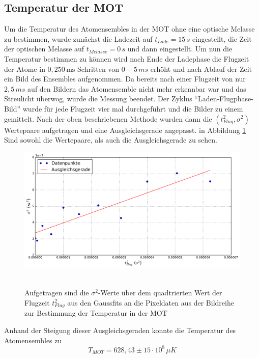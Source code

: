 \documentclass[twoside,colorback,accentcolor=tud4c,11pt]{tudreport}
\begin{document}
\subsection{Temperatur der MOT}
Um die Temperatur des Atomensembles in der MOT ohne eine optische Melasse zu bestimmen, wurde zunächst die Ladezeit auf $t_{Lade}=15\,\si{s}$ eingestellt, die Zeit der optischen Melasse auf $t_{Melasse}=0\,\si{s}$ und dann eingestellt. Um nun die Temperatur bestimmen zu können wird nach Ende der Ladephase die Flugzeit der Atome in $0,250\,\si{\ms}$ Schritten von $0-5\,\si{ms}$ erhöht und nach Ablauf der Zeit ein Bild des Ensembles aufgenommen. Da bereits nach einer Flugzeit von nur $2,5\,\si{ms}$ auf den Bildern das Atomensemble nicht mehr erkennbar war und das Streulicht überwog, wurde die Messung beendet. Der Zyklus "`Laden-Flugphase-Bild"' wurde für jede Flugzeit vier mal durchgeführt und die Bilder zu einem gemittelt. Nach der oben beschriebenen Methode wurden dann die $(t_{Flug}^2,\sigma^2)$ Wertepaare aufgetragen und eine Ausgleichsgerade angepasst. in Abbildung \ref{tmot} Sind sowohl die Wertepaare, als auch die Ausgleichsgerade zu sehen.
\begin{figure}[H]
\centering
   	\begin{minipage}[b]{0.85\textwidth}
   	\includegraphics[width=\textwidth]{graphics/tempmot.pdf}\
   	\end{minipage}
\caption{Aufgetragen sind die $\sigma^2$-Werte über dem quadtrierten Wert der Flugzeit $t_{Flug}^2$ aus den Gaussfits an die Pixeldaten aus der Bildreihe zur Bestimmung der Temperatur in der MOT}\label{tmot}	
\end{figure}
Anhand der Steigung dieser Ausgleichsgeraden konnte die Temperatur des Atomensembles zu 
\begin{equation}
T_{MOT}=628,43\pm 15\cdot 10^{8}\,\si{\mu K}
\end{equation}
\end{document}

